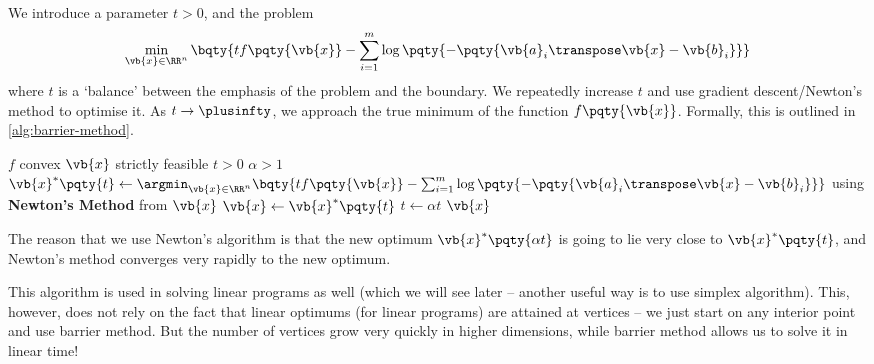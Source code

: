 We introduce a parameter \(t > 0\), and the problem
\[
    \min_{\vb{x} \in \RR^n} \bqty{t f\pqty{\vb{x}} - \sum_{i = 1}^{m} \log\pqty{- \pqty{\vb{a}_i\transpose \vb{x} - \vb{b}_i}}}
\]
where \(t\) is a `balance' between the emphasis of the problem and the boundary. We repeatedly increase \(t\) and use gradient descent/Newton's method to optimise it. As \(t \to \plusinfty\), we approach the true minimum of the function \(f\pqty{\vb{x}}\). Formally, this is outlined in \autoref{alg:barrier-method}.

\begin{algorithm}[ht!]
    \caption{Barrier Method}\label{alg:barrier-method}%
    \begin{algorithmic}
        \Require \(f\) convex
        \Require \(\vb{x}\) strictly feasible
        \Require \(t > 0\)
        \Require \(\alpha > 1\)
        \Repeat
            \State \(\vb{x}^{\ast} \pqty{t} \gets \argmin_{\vb{x} \in \RR^n} \bqty{t f\pqty{\vb{x}} - \sum_{i = 1}^{m} \log\pqty{- \pqty{\vb{a}_i\transpose \vb{x} - \vb{b}_i}}}\) using \textbf{Newton's Method} from \(\vb{x}\)
            \State \(\vb{x} \gets \vb{x}^{\ast} \pqty{t}\)
            \State \(t \gets \alpha t\)
        \State \Return \(\vb{x}\)
        \EndFunction
    \end{algorithmic}
\end{algorithm}

The reason that we use Newton's algorithm is that the new optimum \(\vb{x}^{\ast} \pqty{\alpha t}\) is going to lie very close to \(\vb{x}^{\ast} \pqty{t}\), and Newton's method converges very rapidly to the new optimum.

This algorithm is used in solving linear programs as well (which we will see later -- another useful way is to use simplex algorithm). This, however, does not rely on the fact that linear optimums (for linear programs) are attained at vertices -- we just start on any interior point and use barrier method. But the number of vertices grow very quickly in higher dimensions, while barrier method allows us to solve it in linear time!